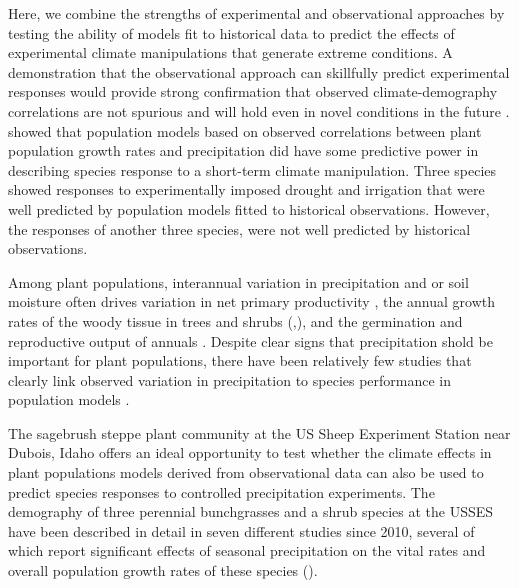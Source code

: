 \documentclass[11pt]{article}
\begin{document}
\begin{doublespacing}
Here, we combine the strengths of experimental and observational approaches by testing the ability of models fit to historical data to predict the effects of experimental climate manipulations that generate extreme conditions. A demonstration that the observational approach can skillfully predict experimental responses would provide strong confirmation that observed climate-demography correlations are not spurious and will hold even in novel conditions in the future \cite{adler_can_2013}. \citep{adler_can_2013} showed that population models based on observed correlations between plant population growth rates and precipitation did have some predictive power in describing species response to a short-term climate manipulation. Three species showed responses to experimentally imposed drought and irrigation that were well predicted by population models fitted to historical observations.  However, the responses of another three species, were not well predicted by historical observations. 

Among plant populations, interannual variation in precipitation and or soil moisture often drives variation in net primary productivity \citep{knapp_variation_2001,hsu_anticipating_2014}, the annual growth rates of the woody tissue in trees and shrubs (\citep{yang_3500-year_2014},\citep{srur_annual_2009,franklin_growth_2013}), and the germination and reproductive output of annuals \citep{venable_bet_2007}. Despite clear signs that precipitation shold be important for plant populations, there have been relatively few studies that clearly link observed variation in precipitation to species performance in population models \citep{ehrlen_advancing_2016}.   

The sagebrush steppe plant community at the US Sheep Experiment Station near Dubois, Idaho offers an ideal opportunity to test whether the climate effects in plant populations models derived from observational data can also be used to predict species responses to controlled precipitation experiments. The demography of three perennial bunchgrasses and a shrub species at the USSES have been described in detail in seven different studies since 2010, several of which report significant effects of seasonal precipitation on the vital rates and overall population growth rates of these species (\citep{adler_coexistence_2010,adler_forecasting_2012,adler_weak_2009,adler_weak_2016,chu_direct_2016,chu_large_2015,dalgleish_climate_2010}).


\end{doublespacing}
\end{document}

